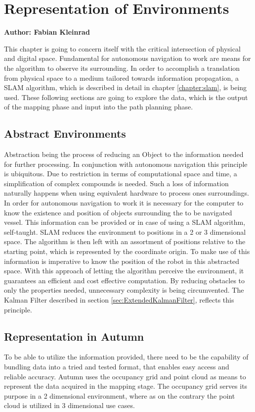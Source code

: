 \chapter{Representation of Environments}
\label{chapter:abstract_env}

\textbf{Author: Fabian Kleinrad} 

This chapter is going to concern itself with the critical intersection of physical and digital space. Fundamental for autonomous navigation to work are means for the algorithm to observe its surrounding. In order to accomplish a translation from physical space to a medium tailored towards information propagation, a SLAM algorithm, which is described in detail in chapter \ref{chapter:slam}, is being used. These following sections are going to explore the data, which is the output of the mapping phase and input into the path planning phase.

\section{Abstract Environments}

Abstraction being the process of reducing an Object to the information needed for further processing. In conjunction with autonomous navigation this principle is ubiquitous. Due to restriction in terms of computational space and time, a simplification of complex compounds is needed. Such a loss of information naturally happens when using equivalent hardware to process ones surroundings.\newline
In order for autonomous navigation to work it is necessary for the computer to know the existence and position of objects surrounding the to be navigated vessel. This information can be provided or in case of using a SLAM algorithm, self-taught. SLAM reduces the environment to positions in a 2 or 3 dimensional space. The algorithm is then left with an assortment of positions relative to the starting point, which is represented by the coordinate origin. To make use of this information is imperative to know the position of the robot in this abstracted space.\newline
With this approach of letting the algorithm perceive the environment, it guarantees an efficient and cost effective computation. By reducing obstacles to only the properties needed, unnecessary complexity is being circumvented.      
The Kalman Filter described in section \ref{sec:ExtendedKalmanFilter}, reflects this principle.

\section{Representation in Autumn}
To be able to utilize the information provided, there need to be the capability of bundling data into a tried and tested format, that enables easy access and reliable accuracy.\newline
Autumn uses the occupancy grid and point cloud as means to represent the data acquired in the mapping stage. The occupancy grid serves its purpose in a 2 dimensional environment, where as on the contrary the point cloud is utilized in 3 dimensional use cases.

